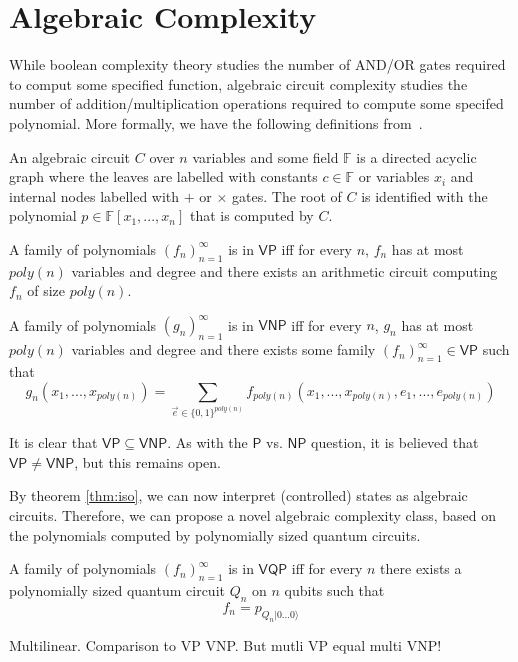 \section{Algebraic Complexity}

While boolean complexity theory studies the number of AND/OR gates required to comput some specified function, algebraic circuit complexity studies the number of addition/multiplication operations required to compute some specifed polynomial. More formally, we have the following definitions from~\cite{shpilka2010arithmetic}.

\begin{definition}
	An algebraic circuit $C$ over $n$ variables and some field $\mathbb{F}$ is a directed acyclic graph where the leaves are labelled with constants $c \in \mathbb{F}$ or variables $x_i$ and internal nodes labelled with $+$ or $\times$ gates. The root of $C$ is identified with the polynomial $p \in \mathbb{F}[x_1, ..., x_n]$ that is computed by $C$.
\end{definition}


\begin{definition}
    A family of polynomials $(f_n)_{n=1}^\infty$ is in $\mathsf{VP}$ iff for every $n$, $f_n$ has at most $poly(n)$ variables and degree and there exists an arithmetic circuit computing $f_n$ of size $poly(n)$.
\end{definition}


\begin{definition}
    A family of polynomials $(g_n)_{n=1}^\infty$ is in $\mathsf{VNP}$ iff for every $n$, $g_n$ has at most $poly(n)$ variables and degree and there exists some family $(f_n)_{n=1}^\infty \in \mathsf{VP}$ such that $$g_n(x_1, ..., x_{poly(n)}) = \sum_{\Vec{e} \in \{0, 1\}^{poly(n)}} f_{poly(n)}(x_1, ..., x_{poly(n)}, e_1, ..., e_{poly(n)})$$
\end{definition}

It is clear that $\mathsf{VP} \subseteq \mathsf{VNP}$. As with the $\mathsf{P}$ vs. $\mathsf{NP}$ question, it is believed that $\mathsf{VP} \neq \mathsf{VNP}$, but this remains open. 

By theorem \ref{thm:iso}, we can now interpret (controlled) states as algebraic circuits. Therefore, we can propose a novel algebraic complexity class, based on the polynomials computed by polynomially sized quantum circuits.

\begin{definition}
    A family of polynomials $(f_n)_{n=1}^\infty$ is in $\mathsf{VQP}$ iff for every $n$ there exists a polynomially sized quantum circuit $Q_n$ on $n$ qubits such that $$f_n = p_{Q_n|0...0\rangle}$$
\end{definition}


Multilinear. Comparison to VP VNP. But mutli VP equal multi VNP!